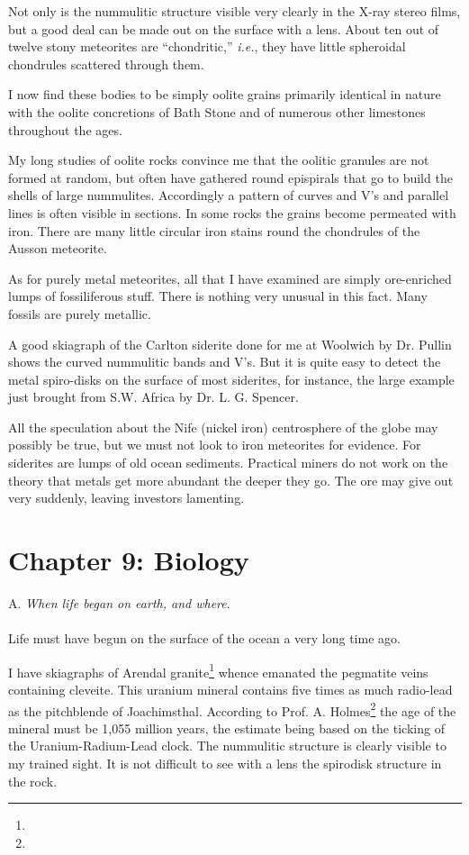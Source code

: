 \documentclass[a4paper, 12pt, oneside]{article}
\begin{document}
Not only is the nummulitic structure visible very clearly in the X-ray stereo films, but a good deal can be made out on the surface with a lens. About ten out of twelve stony meteorites are ``chondritic,'' \emph{i.e.}, they have little spheroidal chondrules scattered through them.

I now find these bodies to be simply oolite grains primarily identical in nature with the oolite concretions of Bath Stone and of numerous other limestones throughout the ages.

My long studies of oolite rocks convince me that the oolitic granules are not formed at random, but often have gathered round epispirals that go to build the shells of large nummulites. Accordingly a pattern of curves and V's and parallel lines is often visible in sections. In some rocks the grains become permeated with iron. There are many little circular iron stains round the chondrules of the Ausson meteorite.

As for purely metal meteorites, all that I have examined are simply ore-enriched lumps of fossiliferous stuff. There is nothing very unusual in this fact. Many fossils are purely metallic.

A good skiagraph of the Carlton siderite done for me at Woolwich by Dr. Pullin shows the curved nummulitic bands and V's. But it is quite easy to detect the metal spiro-disks on the surface of most siderites, for instance, the large example just brought from S.W. Africa by Dr. L. G. Spencer.

All the speculation about the Nife (nickel iron) centrosphere of the globe may possibly be true, but we must not look to iron meteorites for evidence. For siderites are lumps of old ocean sediments. Practical miners do not work on the theory that metals get more abundant the deeper they go. The ore may give out very suddenly, leaving investors lamenting.
\clearpage
\section{Chapter 9: Biology}
\centerline{A. \emph{When life began on earth, and where}.}
\paragraph{}
Life must have begun on the surface of the ocean a very long time ago.

I have skiagraphs of Arendal granite\footnote{} whence emanated the pegmatite veins containing cleveite. This uranium mineral contains five times as much radio-lead as the pitchblende of Joachimsthal. According to Prof. A. Holmes\footnote{} the age of the mineral must be 1,055 million years, the estimate being based on the ticking of the Uranium-Radium-Lead clock. The nummulitic structure is clearly visible to my trained sight. It is not difficult to see with a lens the spirodisk structure in the rock.
\end{document}
